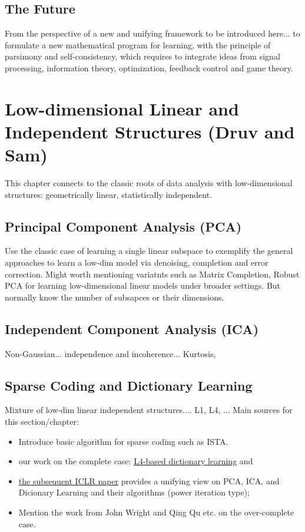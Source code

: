 \documentclass{article}
\begin{document}
\subsection{The Future}
From the perspective of a new and unifying framework to be introduced here... to formulate a new mathematical program for learning, with the principle of parsimony and self-consistency, which requires to integrate ideas from signal processing, information theory, optimization, feedback control and game theory. 

\section{Low-dimensional Linear and Independent Structures (Druv and Sam)}
This chapter connects to the classic roots of data analysis with low-dimensional structures: geometrically linear, statistically independent.

\subsection{Principal Component Analysis (PCA)} 
Use the classic case of learning a single linear subspace to exemplify the general approaches to learn a low-dim model via denoising, completion and error correction. Might worth mentioning variatnts such as Matrix Completion, Robust PCA for learning low-dimensional linear models under broader settings. But normally know the number of subsapces or their dimensions.
\subsection{Independent Component Analysis (ICA)} Non-Gaussian... independence and incoherence... Kurtosis, 

\subsection{Sparse Coding and Dictionary Learning} Mixture of low-dim linear independent structures.... L1, L4, ... Main sources for this section/chapter: 
\begin{itemize}
\item Introduce basic algorithm for sparse coding such as ISTA.
\item our work on the complete case: \href{https://arxiv.org/abs/1906.02435}{L4-based dictionary learning} and
\item \href{https://openreview.net/pdf?id=SJeY-1BKDS}{the subsequent ICLR paper} provides a unifying view on PCA, ICA, and Dicionary Learning and their algorithms (power iteration type); 
\item  Mention the work from John Wright and Qing Qu etc. on the over-complete case.
\end{itemize}
\end{document}
